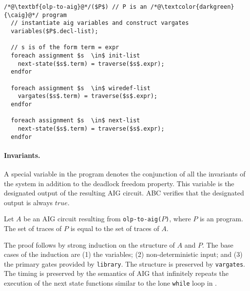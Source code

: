 \begin{lstlisting}
/*@\textbf{olp-to-aig}@*/($P$) // P is an /*@\textcolor{darkgreen}{\caig}@*/ program
  // instantiate aig variables and construct vargates
  variables($P$.decl-list); 
  
  // s is of the form term = expr 
  foreach assignment $s  \in$ init-list 
    next-state($s$.term) = traverse($s$.expr);  
  endfor
  
  foreach assignment $s  \in$ wiredef-list
    vargates($s$.term) = traverse($s$.expr);  
  endfor
  
  foreach assignment $s  \in$ next-list
    next-state($s$.term) = traverse($s$.expr);  
  endfor
\end{lstlisting}


\paragraph{Invariants.}
A special variable in the \caig program denotes the conjunction of all the invariants of the system in addition to the deadlock freedom property. This variable is the designated output of the resulting 
AIG circuit. ABC verifies that the designated output is always $true$. 


\begin{theorem}
Let $A$ be an AIG circuit resulting from \texttt{olp-to-aig($P$)}, where $P$ is an \caig program. The set of traces of $P$ is equal to the set of traces of $A$.
\end{theorem} 
The proof follows by strong induction on the structure of $A$ and $P$. 
The base cases of the induction are 
(1) the variables;
(2) non-deterministic input; and 
(3) the primary gates provided by \texttt{library}. 
The structure is preserved by \texttt{vargates}. 
The timing is preserved by the semantics of AIG that infinitely repeats the execution of the 
next state functions similar to the lone \texttt{while} loop in \caig.



